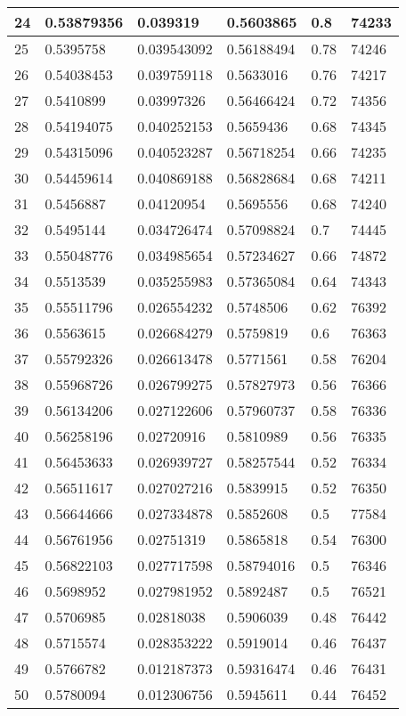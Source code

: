 \begin{longtable}{|l|l|l|l|l|l|}
24 & 0.53879356 & 0.039319 & 0.5603865 & 0.8 & 74233 \\ \hline 
25 & 0.5395758 & 0.039543092 & 0.56188494 & 0.78 & 74246 \\ \hline 
26 & 0.54038453 & 0.039759118 & 0.5633016 & 0.76 & 74217 \\ \hline 
27 & 0.5410899 & 0.03997326 & 0.56466424 & 0.72 & 74356 \\ \hline 
28 & 0.54194075 & 0.040252153 & 0.5659436 & 0.68 & 74345 \\ \hline 
29 & 0.54315096 & 0.040523287 & 0.56718254 & 0.66 & 74235 \\ \hline 
30 & 0.54459614 & 0.040869188 & 0.56828684 & 0.68 & 74211 \\ \hline 
31 & 0.5456887 & 0.04120954 & 0.5695556 & 0.68 & 74240 \\ \hline 
32 & 0.5495144 & 0.034726474 & 0.57098824 & 0.7 & 74445 \\ \hline 
33 & 0.55048776 & 0.034985654 & 0.57234627 & 0.66 & 74872 \\ \hline 
34 & 0.5513539 & 0.035255983 & 0.57365084 & 0.64 & 74343 \\ \hline 
35 & 0.55511796 & 0.026554232 & 0.5748506 & 0.62 & 76392 \\ \hline 
36 & 0.5563615 & 0.026684279 & 0.5759819 & 0.6 & 76363 \\ \hline 
37 & 0.55792326 & 0.026613478 & 0.5771561 & 0.58 & 76204 \\ \hline 
38 & 0.55968726 & 0.026799275 & 0.57827973 & 0.56 & 76366 \\ \hline 
39 & 0.56134206 & 0.027122606 & 0.57960737 & 0.58 & 76336 \\ \hline 
40 & 0.56258196 & 0.02720916 & 0.5810989 & 0.56 & 76335 \\ \hline 
41 & 0.56453633 & 0.026939727 & 0.58257544 & 0.52 & 76334 \\ \hline 
42 & 0.56511617 & 0.027027216 & 0.5839915 & 0.52 & 76350 \\ \hline 
43 & 0.56644666 & 0.027334878 & 0.5852608 & 0.5 & 77584 \\ \hline 
44 & 0.56761956 & 0.02751319 & 0.5865818 & 0.54 & 76300 \\ \hline 
45 & 0.56822103 & 0.027717598 & 0.58794016 & 0.5 & 76346 \\ \hline 
46 & 0.5698952 & 0.027981952 & 0.5892487 & 0.5 & 76521 \\ \hline 
47 & 0.5706985 & 0.02818038 & 0.5906039 & 0.48 & 76442 \\ \hline 
48 & 0.5715574 & 0.028353222 & 0.5919014 & 0.46 & 76437 \\ \hline 
49 & 0.5766782 & 0.012187373 & 0.59316474 & 0.46 & 76431 \\ \hline 
50 & 0.5780094 & 0.012306756 & 0.5945611 & 0.44 & 76452 \\ \hline 
\end{longtable}